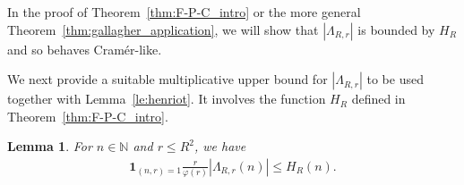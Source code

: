 \documentclass[12pt]{amsart}
\newtheorem{lemma}[theorem]{Lemma}
\theoremstyle{definition}
\theoremstyle{remark}
\numberwithin{equation}{section}
\newcommand{\1}{\mathbf{1}}
\begin{document}
In the proof of Theorem~\ref{thm:F-P-C_intro} or the more general Theorem~\ref{thm:gallagher_application}, we will show that $|\Lambda_{R,r}|$ is bounded by $H_R$ and so behaves Cram\'er-like.
	

 


We next provide a suitable multiplicative upper bound for $|\Lambda_{R,r}|$ to be used together with Lemma~\ref{le:henriot}. It involves the function $H_R$ defined in Theorem~\ref{thm:F-P-C_intro}.
\begin{lemma}\label{lem:LRupper}
  For $n\in \mathbb{N}$ and $r\le R^2$, we have
    \begin{align*}
        \1_{(n,r)=1}\frac{r}{\varphi(r)}|\Lambda_{R,r}(n)|\leq H_R(n).
    \end{align*}
\end{lemma}
\end{document}
